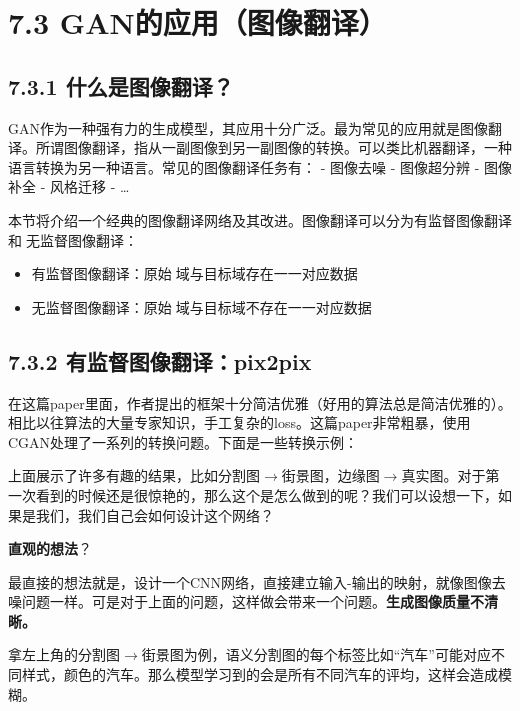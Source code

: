 \section{7.3
GAN的应用（图像翻译）}\label{ganux7684ux5e94ux7528ux56feux50cfux7ffbux8bd1}

\subsection{7.3.1
什么是图像翻译？}\label{ux4ec0ux4e48ux662fux56feux50cfux7ffbux8bd1}

​
GAN作为一种强有力的生成模型，其应用十分广泛。最为常见的应用就是图像翻译。所谓图像翻译，指从一副图像到另一副图像的转换。可以类比机器翻译，一种语言转换为另一种语言。常见的图像翻译任务有：
- 图像去噪 - 图像超分辨 - 图像补全 - 风格迁移 - \ldots{}

本节将介绍一个经典的图像翻译网络及其改进。图像翻译可以分为有监督图像翻译和无监督图像翻译：

\begin{itemize}
\item
  有监督图像翻译：原始域与目标域存在一一对应数据
\item
  无监督图像翻译：原始域与目标域不存在一一对应数据
\end{itemize}

\subsection{7.3.2
有监督图像翻译：pix2pix}\label{ux6709ux76d1ux7763ux56feux50cfux7ffbux8bd1pix2pix}

​
在这篇paper里面，作者提出的框架十分简洁优雅（好用的算法总是简洁优雅的）。相比以往算法的大量专家知识，手工复杂的loss。这篇paper非常粗暴，使用CGAN处理了一系列的转换问题。下面是一些转换示例：

​
上面展示了许多有趣的结果，比如分割图\(\longrightarrow\)街景图，边缘图\(\longrightarrow\)真实图。对于第一次看到的时候还是很惊艳的，那么这个是怎么做到的呢？我们可以设想一下，如果是我们，我们自己会如何设计这个网络？

\textbf{直观的想法}？

​
最直接的想法就是，设计一个CNN网络，直接建立输入-输出的映射，就像图像去噪问题一样。可是对于上面的问题，这样做会带来一个问题。\textbf{生成图像质量不清晰。}

​
拿左上角的分割图\(\longrightarrow\)街景图为例，语义分割图的每个标签比如``汽车''可能对应不同样式，颜色的汽车。那么模型学习到的会是所有不同汽车的评均，这样会造成模糊。%

